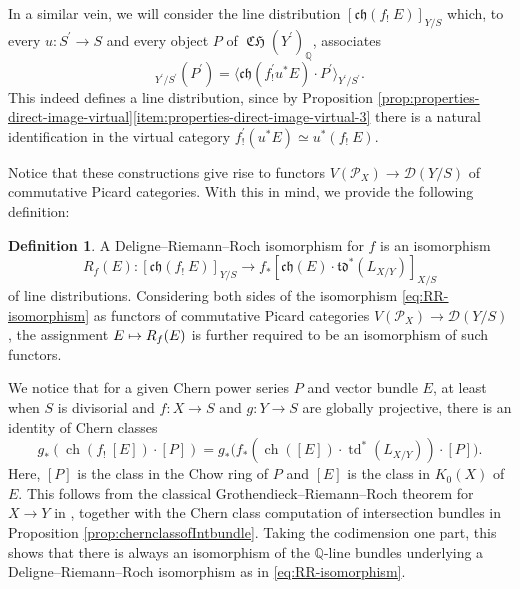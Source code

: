 \documentclass[11pt]{article}
\newcommand\mto{\mathchoice{\longmapsto}{\mapsto}{\mapsto}{\mapsto}}
\theoremstyle{plain}
\theoremstyle{definition}
\newtheorem{definition}[theorem]{Definition}
\newcommand{\QBbb}{\mathbb Q}
\newcommand{\Dcal}{\mathcal D}
\newcommand{\Pcal}{\mathcal P}
\newcommand{\chfrak}{\mathfrak {ch}}
\newcommand{\tdfrak}{\mathfrak {td}}
\DeclareMathOperator{\ch}{ch}
\DeclareMathOperator{\CHfrak}{\mathfrak{CH}}
\DeclareMathOperator{\td}{td}
\begin{document}
In a similar vein, we will consider the line distribution $[\chfrak(f_{!}\ E)]_{Y/S}$ which, to every $u\colon S^{\prime}\to S$ and every object $P$ of $\CHfrak(Y^{\prime})_{\QBbb}$, associates\vspace*{-3pt}\enlargethispage{.5\baselineskip}
\begin{displaymath}
[\chfrak(f_!\ E)]_{Y^{\prime}/S^{\prime}}(P^{\prime})=\langle\chfrak(f^{\prime}_{!} u^{\ast} E)\cdot P^{\prime}\rangle_{Y^{\prime}/S^{\prime}}.
\end{displaymath}
This indeed defines a line distribution, since by Proposition \ref{prop:properties-direct-image-virtual}\eqref{item:properties-direct-image-virtual-3} there is a natural identification in the virtual category $f^{\prime}_! (u^{\ast} E) \simeq u^{\ast} (f_!\ E)$.

Notice that these constructions give rise to functors $V(\Pcal_X)\to \Dcal(Y/S)$ of commutative Picard categories. With this in mind, we provide the following definition:
\begin{definition}
A Deligne--Riemann--Roch isomorphism for $f$ is an isomorphism\vspace*{-3pt}
\begin{equation}\label{eq:RR-isomorphism}
R_{f}(E)\colon [\chfrak(f_!\ E)]_{Y/S}\to f_\ast [\chfrak(E) \cdot \tdfrak^{\ast}(L_{X/Y})]_{X/S}
\end{equation}
of line distributions. Considering both sides of the isomorphism \eqref{eq:RR-isomorphism} as functors of commutative Picard categories $V(\Pcal_X)\to \Dcal(Y/S)$, the assignment $E\mto R_{f}(E)$ is further required to be an isomorphism of such functors.
\end{definition}

We notice that for a given Chern power series $P$ and vector bundle $E$, at least when $S$ is divisorial and $f: X \to S$ and $g: Y \to S$ are globally projective, there is an identity of Chern classes\vspace*{-3pt}
\begin{displaymath}
g_\ast \left(\ch(f_!\ [E]) \cdot [P] \right)= g_\ast \bigl(f_{\ast}(\ch([E]) \cdot \td^{\ast}(L_{X/Y})) \cdot [P]\bigr).
\end{displaymath}
Here, $[P]$ is the class in the Chow ring of $P $ and $[E]$ is the class in $K_0(X)$ of $E$. This follows from the classical Grothendieck--Riemann--Roch theorem for $X \to Y$ in \cite[Exp.\,VIII]{SGA6}, together with the Chern class computation of intersection bundles in Proposition \ref{prop:chernclassofIntbundle}. Taking the codimension one part, this shows that there is always an isomorphism of the $\QBbb$-line bundles underlying a Deligne--Riemann--Roch isomorphism as in \eqref{eq:RR-isomorphism}.
\end{document}
